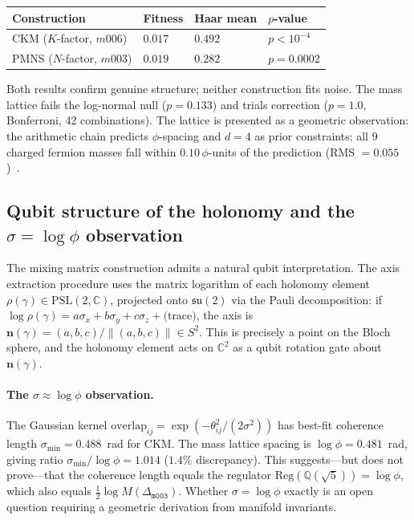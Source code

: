 ﻿\documentclass[12pt]{article}
\theoremstyle{definition}
\begin{document}
\begin{center}\small
\begin{tabular}{llll}
\toprule
Construction & Fitness & Haar mean & $p$-value\\
\midrule
CKM ($K$-factor, $m006$) & $0.017$ & $0.492$ & $p<10^{-4}$\\
PMNS ($N$-factor, $m003$) & $0.019$ & $0.282$ & $p=0.0002$\\
\bottomrule
\end{tabular}
\end{center}

Both results confirm genuine structure; neither construction fits noise.
The mass lattice fails the log-normal null ($p=0.133$) and trials
correction ($p=1.0$, Bonferroni, 42 combinations). The lattice is
presented as a geometric observation: the arithmetic chain predicts
$\phi$-spacing and $d=4$ as prior constraints; all 9 charged fermion
masses fall within $0.10\,\phi$-units of the prediction
(RMS $=0.055$)~\cite{Gentry:Scan}.


\subsection{Qubit structure of the holonomy and the $\sigma = \log\phi$ observation}
\label{subsec:qubit}

The mixing matrix construction admits a natural qubit interpretation.
The axis extraction procedure uses the matrix logarithm of each holonomy
element $\rho(\gamma)\in\mathrm{PSL}(2,\mathbb{C})$, projected onto
$\mathfrak{su}(2)$ via the Pauli decomposition: if
$\log\rho(\gamma) = a\sigma_x + b\sigma_y + c\sigma_z + \text{(trace)}$,
the axis is $\mathbf{n}(\gamma)=(a,b,c)/\|(a,b,c)\|\in S^2$.
This is precisely a point on the Bloch sphere, and the holonomy element
acts on $\mathbb{C}^2$ as a qubit rotation gate about $\mathbf{n}(\gamma)$.


\paragraph{The $\sigma\approx\log\phi$ observation.}
The Gaussian kernel
$\mathrm{overlap}_{ij}=\exp(-\theta_{ij}^2/(2\sigma^2))$
has best-fit coherence length $\sigma_{\min}=0.488$~rad for CKM.
The mass lattice spacing is $\log\phi=0.481$~rad, giving ratio
$\sigma_{\min}/\log\phi=1.014$ ($1.4\%$ discrepancy).
This suggests---but does not prove---that the coherence length
equals the regulator $\mathrm{Reg}(\mathbb{Q}(\sqrt5))=\log\phi$,
which also equals $\tfrac{1}{2}\log M(\Delta_{\texttt{m003}})$.
Whether $\sigma=\log\phi$ exactly is an open question requiring
a geometric derivation from manifold invariants.
\end{document}
